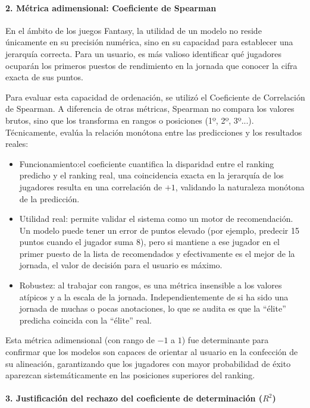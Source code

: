 \paragraph{2. Métrica adimensional: Coeficiente de Spearman}

En el ámbito de los juegos Fantasy, la utilidad de un modelo no reside únicamente en su precisión numérica, sino en su capacidad para establecer una 
jerarquía correcta. Para un usuario, es más valioso identificar qué jugadores ocuparán los primeros puestos de rendimiento en la jornada que conocer la cifra exacta de sus puntos.

Para evaluar esta capacidad de ordenación, se utilizó el Coeficiente de Correlación de Spearman. A diferencia de otras métricas, Spearman no compara
 los valores brutos, sino que los transforma en rangos o posiciones (1º, 2º, 3º...). Técnicamente, evalúa la relación monótona entre las predicciones y los resultados reales:

\begin{itemize}
\item Funcionamiento:el coeficiente cuantifica la disparidad entre el ranking predicho y el ranking real, una coincidencia exacta en la jerarquía de los jugadores resulta en una correlación de $+1$, validando la naturaleza monótona de la predicción.

\item Utilidad real: permite validar el sistema como un motor de recomendación. Un modelo puede tener un error de puntos elevado (por ejemplo, predecir 15 puntos cuando el jugador suma 8), pero si mantiene a ese jugador en el primer puesto de la lista de recomendados y efectivamente es el mejor de la jornada, el valor de decisión para el usuario es máximo.

\item Robustez: al trabajar con rangos, es una métrica insensible a los valores atípicos y a la escala de la jornada. Independientemente de si ha sido una jornada de muchas o pocas anotaciones, lo que se audita es que la ``élite'' predicha coincida con la ``élite'' real.
\end{itemize}

Esta métrica adimensional (con rango de $-1$ a $1$) fue determinante para confirmar que los modelos son capaces de orientar al usuario en la confección 
de su alineación, garantizando que los jugadores con mayor probabilidad de éxito aparezcan sistemáticamente en las posiciones superiores del ranking.

\paragraph{3. Justificación del rechazo del coeficiente de determinación ($R^2$)}

